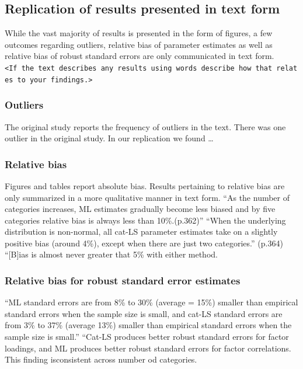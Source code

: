 \documentclass[10,a4paperpaper,]{article}
\begin{document}
\subsection{Replication of results presented in text form }

While the vast majority of results is presented in the form of figures,
a few outcomes regarding outliers, relative bias of parameter estimates
as well as relative bias of robust standard errors are only communicated
in text form.
\texttt{\textless{}If\ the\ text\ describes\ any\ results\ using\ words\ describe\ how\ that\ relates\ to\ your\ findings.\textgreater{}}

\subsubsection{Outliers}

The original study reports the frequency of outliers in the text. There
was one outlier in the original study. In our replication we found
\ldots{}

\subsubsection{Relative bias}

Figures and tables report absolute bias. Results pertaining to relative
bias are only summarized in a more qualitative manner in text form. ``As
the number of categories increases, ML estimates gradually become less
biased and by five categories relative bias is always less than
10\%.(p.362)'' ``When the underlying distribution is non-normal, all
cat-LS parameter estimates take on a slightly positive bias (around
4\%), except when there are just two categories.'' (p.364) ``{[}B{]}ias
is almost never greater that 5\% with either method.

\subsubsection{Relative bias for robust standard error estimates}

``ML standard errors are from 8\% to 30\% (average = 15\%) smaller than
empirical standard errors when the sample size is small, and cat-LS
standard errors are from 3\% to 37\% (average 13\%) smaller than
empirical standard errors when the sample size is small.'' ``Cat-LS
produces better robust standard errors for factor loadings, and ML
produces better robust standard errors for factor correlations. This
finding isconsistent across number od categories.
\end{document}
